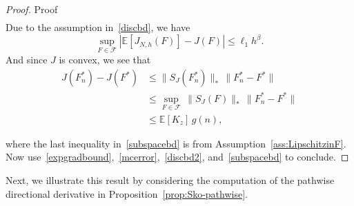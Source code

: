\documentclass[11pt,leqno]{amsart}
\begin{document}
\begin{proof}{Proof}
\begin{equation}
\begin{aligned}
\end{aligned}
\end{equation}
Due to the assumption in~\eqref{discbd}, we have \begin{equation}\label{discbd2}\sup_{F \in \mathcal{F}} |\mathbb{E}\left[J_{N,h}(F)\right] - J(F)| \leq \ell_1 h^\beta.\end{equation} And since $J$ is convex, we see that
\begin{equation}\label{subspacebd} 
\begin{aligned}
J(F^*_n) - J(F^*) & \leq  \|S_J(F^*_n)\|_{*} \, \|F^*_n - F^*\| \\&\leq \sup_{F \in \mathcal{F}} \, \|S_J(F)\|_{*} \, \|F^*_n - F^*\|\\
&\leq \mathbb{E}\left[K_{z}\right] \, g(n),
\end{aligned}     
\end{equation}

where the last inequality in~\eqref{subspacebd} is from Assumption~\ref{ass:LipschitzinF}.  Now use~\eqref{expgradbound},~\eqref{mcerror},~\eqref{discbd2}, and~\eqref{subspacebd} to conclude.
 \end{proof}
Next, we illustrate this result by considering the computation of the pathwise directional derivative in Proposition~\ref{prop:Sko-pathwise}.
\end{document}
